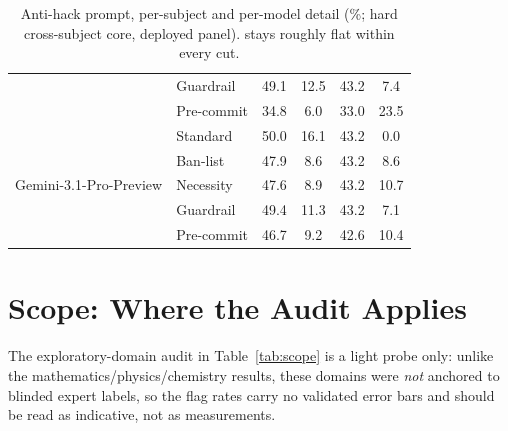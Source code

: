 \begin{table}[!htbp]
{\begin{tabular}{ll cccc}
 & Guardrail   & 49.1 & 12.5 & 43.2 & \phantom{0}7.4 \\
 & Pre-commit  & 34.8 & \phantom{0}6.0 & 33.0 & 23.5 \\
\midrule
\multirow{5}{*}{Gemini-3.1-Pro-Preview}
 & Standard    & 50.0 & 16.1 & 43.2 & \phantom{0}0.0 \\
 & Ban-list    & 47.9 & \phantom{0}8.6 & 43.2 & \phantom{0}8.6 \\
 & Necessity   & 47.6 & \phantom{0}8.9 & 43.2 & 10.7 \\
 & Guardrail   & 49.4 & 11.3 & 43.2 & \phantom{0}7.1 \\
 & Pre-commit  & 46.7 & \phantom{0}9.2 & 42.6 & 10.4 \\
\bottomrule
\end{tabular}}
\caption{Anti-hack prompt, per-subject and per-model detail (\%; hard cross-subject core, deployed panel). \daa{} stays roughly flat within every cut.}
\label{tab:mitigation-detail}
\end{table}
\FloatBarrier

\section{Scope: Where the Audit Applies}
\label{app:scopeapp}

The exploratory-domain audit in Table~\ref{tab:scope} is a light probe only: unlike the mathematics/physics/chemistry results, these domains were \emph{not} anchored to blinded expert labels, so the flag rates carry no validated error bars and should be read as indicative, not as measurements.

\begin{table}[!htbp]
\centering\small
{}
\caption{Exploratory domains (detector not gold-validated). On recall-based controls the flag rate is not interpretable as hacking.}
\label{tab:scope}
\end{table}
\FloatBarrier

